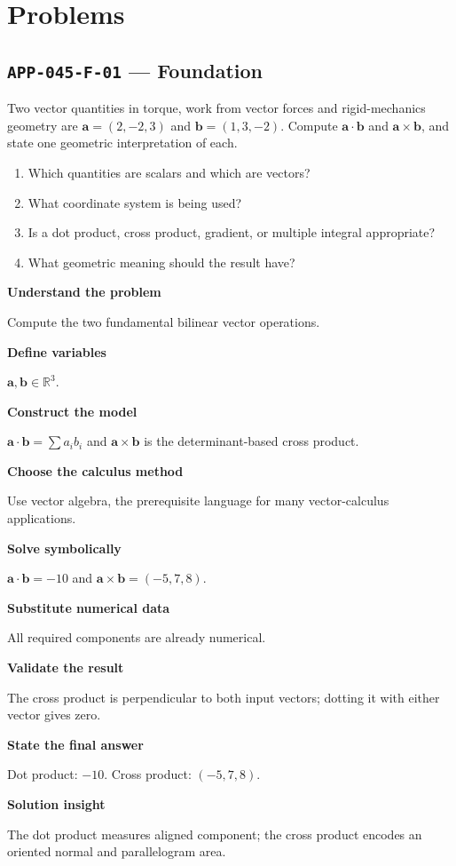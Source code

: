 \documentclass[11pt]{book}
\newcommand{\pid}[1]{\texttt{#1}}
\begin{document}
\section*{Problems}
\subsection*{\pid{APP-045-F-01} — Foundation}
\begin{problembox}
Two vector quantities in torque, work from vector forces and rigid-mechanics geometry are $\mathbf a=(2,-2,3)$ and $\mathbf b=(1,3,-2)$. Compute $\mathbf a\cdot\mathbf b$ and $\mathbf a\times\mathbf b$, and state one geometric interpretation of each.
\end{problembox}
\begin{promptbox}\begin{enumerate}
\item Which quantities are scalars and which are vectors?
\item What coordinate system is being used?
\item Is a dot product, cross product, gradient, or multiple integral appropriate?
\item What geometric meaning should the result have?
\end{enumerate}\end{promptbox}
\begin{solutionbox}
\textbf{Understand the problem}\par Compute the two fundamental bilinear vector operations.\par\medskip
\textbf{Define variables}\par $\mathbf a,\mathbf b\in\mathbb R^3$.\par\medskip
\textbf{Construct the model}\par $\mathbf a\cdot\mathbf b=\sum a_ib_i$ and $\mathbf a\times\mathbf b$ is the determinant-based cross product.\par\medskip
\textbf{Choose the calculus method}\par Use vector algebra, the prerequisite language for many vector-calculus applications.\par\medskip
\textbf{Solve symbolically}\par $\mathbf a\cdot\mathbf b=-10$ and $\mathbf a\times\mathbf b=(-5,7,8)$.\par\medskip
\textbf{Substitute numerical data}\par All required components are already numerical.\par\medskip
\textbf{Validate the result}\par The cross product is perpendicular to both input vectors; dotting it with either vector gives zero.\par\medskip
\textbf{State the final answer}\par Dot product: $-10$. Cross product: $(-5,7,8)$.\par\medskip
\textbf{Solution insight}\par The dot product measures aligned component; the cross product encodes an oriented normal and parallelogram area.\par\medskip
\end{solutionbox}
\end{document}
